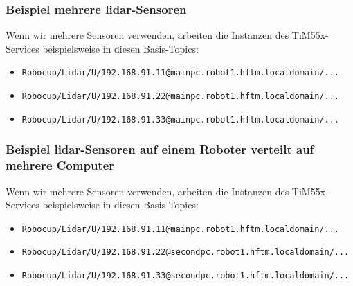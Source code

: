 \subsubsection{Beispiel mehrere \acrshort{lidar}-Sensoren}
Wenn wir mehrere Sensoren verwenden, arbeiten die Instanzen des TiM55x-Services beispielsweise in diesen Basis-Topics:
\begin{itemize}
	\item \texttt{Robocup/Lidar/U/192.168.91.11@mainpc.robot1.hftm.localdomain/...}
	\item \texttt{Robocup/Lidar/U/192.168.91.22@mainpc.robot1.hftm.localdomain/...}
	\item \texttt{Robocup/Lidar/U/192.168.91.33@mainpc.robot1.hftm.localdomain/...}
\end{itemize}

\subsubsection{Beispiel \acrshort{lidar}-Sensoren auf einem Roboter verteilt auf mehrere Computer}
Wenn wir mehrere Sensoren verwenden, arbeiten die Instanzen des TiM55x-Services beispielsweise in diesen Basis-Topics:
\begin{itemize}
	\item \texttt{Robocup/Lidar/U/192.168.91.11@mainpc.robot1.hftm.localdomain/...}
	\item \texttt{Robocup/Lidar/U/192.168.91.22@secondpc.robot1.hftm.localdomain/...}
	\item \texttt{Robocup/Lidar/U/192.168.91.33@secondpc.robot1.hftm.localdomain/...}
\end{itemize}